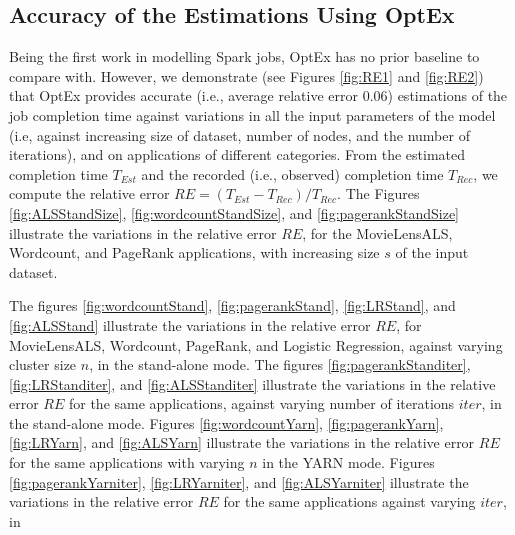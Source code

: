 \documentclass[conference]{IEEEtran}
\begin{document}
\subsection{Accuracy of the Estimations Using OptEx}\label{sec:eval}

















Being the first work in modelling Spark jobs, OptEx has no prior baseline to compare with. However,
    we demonstrate (see Figures \ref{fig:RE1} and \ref{fig:RE2}) that OptEx provides accurate (i.e., average relative error 0.06) estimations of the job completion time against variations
    in all the input parameters of the model (i.e, against increasing size of dataset, number of nodes, and the
    number of iterations), and on applications of different categories. From the estimated completion time $T_{\mathit{Est}}$ and the recorded (i.e., observed) completion time
 $T_{\mathit{Rec}}$, we compute the relative error
 $\mathit{RE} = (T_{\mathit{Est}} - T_{\mathit{Rec}})/T_{\mathit{Rec}}$.
The Figures \ref{fig:ALSStandSize}, \ref{fig:wordcountStandSize}, and \ref{fig:pagerankStandSize} illustrate
 the variations in the relative error $\mathit{RE}$, for the MovieLensALS, Wordcount, and PageRank
   applications, with increasing size $s$ of the input dataset.
    \par The figures \ref{fig:wordcountStand}, \ref{fig:pagerankStand}, \ref{fig:LRStand}, and \ref{fig:ALSStand} illustrate the variations in the relative error  $\mathit{RE}$, for MovieLensALS, Wordcount, PageRank, and Logistic Regression, against
 varying cluster size $n$, in the
 stand-alone mode. The figures \ref{fig:pagerankStanditer}, \ref{fig:LRStanditer}, and \ref{fig:ALSStanditer} illustrate the variations in the relative error  $\mathit{RE}$ for the same applications, against varying
 number of iterations $\mathit{iter}$, in the
 stand-alone mode. Figures \ref{fig:wordcountYarn}, \ref{fig:pagerankYarn}, \ref{fig:LRYarn}, and \ref{fig:ALSYarn} illustrate the variations in  the relative error $\mathit{RE}$ for the same applications with varying $n$ in the  YARN mode.  Figures \ref{fig:pagerankYarniter},
 \ref{fig:LRYarniter}, and \ref{fig:ALSYarniter} illustrate the variations in the relative error $\mathit{RE}$ for the same applications against varying $\mathit{iter}$, in
\end{document}
